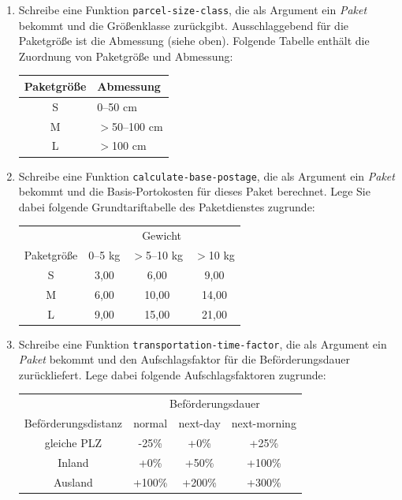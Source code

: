 \begin{aufgabe}
\begin{enumerate}
  \item Schreibe eine Funktion \lstinline{parcel-size-class}, die
    als Argument ein \textit{Paket} bekommt und die Größenklasse
    zurückgibt.  Ausschlaggebend für die Paketgröße ist die Abmessung
    (siehe oben).  Folgende Tabelle enthält die Zuordnung von
    Paketgröße und Abmessung:

    \begin{center}
      \begin{tabular}{c|l}
        Paketgröße & Abmessung \\
        \hline
        S & 0--50 cm \\
        M & $>$50--100 cm \\
        L & $>$100 cm \\
      \end{tabular}
    \end{center}

  \item Schreibe eine Funktion \lstinline{calculate-base-postage},
    die als Argument ein \textit{Paket} bekommt und die
    Basis-Portokosten für dieses Paket berechnet.  Lege Sie dabei
    folgende Grundtariftabelle des Paketdienstes zugrunde:

    \begin{center}
      \begin{tabular}{c|ccc}
        & \multicolumn{3}{c}{Gewicht} \\
        Paketgröße & 0--5 kg & $>$5--10 kg & $>$10 kg \\
        \hline
        S & 3,00 & 6,00 & 9,00 \\
        M & 6,00 & 10,00 & 14,00 \\
        L & 9,00 & 15,00 & 21,00 \\
      \end{tabular}
    \end{center}

    

  \item Schreibe eine Funktion
    \lstinline{transportation-time-factor}, die als Argument ein
    \textit{Paket} bekommt und den Aufschlagsfaktor für die
    Beförderungsdauer zurückliefert.  Lege dabei folgende
    Aufschlagsfaktoren zugrunde:
    
    \begin{center}
      \begin{tabular}{c|ccc}
        & \multicolumn{3}{c}{Beförderungsdauer} \\
        Beförderungsdistanz & normal & next-day & next-morning \\
        \hline
        gleiche PLZ & -25\% & +0\% & +25\% \\
        Inland & +0\% & +50\% & +100\% \\
        Ausland & +100\% & +200\% & +300\% \\
      \end{tabular}
    \end{center}
    

\end{enumerate}
\end{aufgabe}
